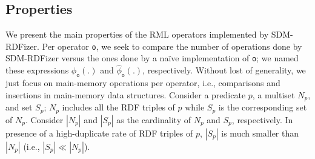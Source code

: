 \subsection{Properties} 
We present the main properties of the RML operators implemented by SDM-RDFizer. Per operator \texttt{o}, we seek to compare the number of operations done by SDM-RDFizer versus the ones done by a na\"ive implementation of \texttt{o}; we named these expressions $\phi_{\texttt{o}}(.)$ and $\widehat{\phi}_{\texttt{o}}(.)$, respectively. Without lost of generality, we just focus on main-memory operations per operator, i.e., comparisons and insertions in main-memory data structures. Consider a predicate $p$, a multiset $N_p$, and set $S_p$; $N_p$ includes all the RDF triples of $p$ while $S_p$ is the corresponding set of $N_p$. Consider $|N_p|$ and $|S_p|$ as the cardinality of $N_p$ and $S_p$, respectively. In presence of a high-duplicate rate of RDF triples of $p$, $|S_p|$ is much smaller than $|N_p|$ (i.e., $|S_p| \ll|N_p|$).
